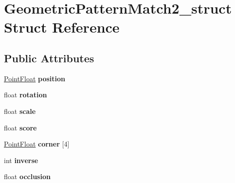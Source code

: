 \hypertarget{structGeometricPatternMatch2__struct}{
\section{GeometricPatternMatch2\_\-struct Struct Reference}
\label{structGeometricPatternMatch2__struct}
}
\subsection*{Public Attributes}
\begin{DoxyCompactItemize}
\item 
\hypertarget{structGeometricPatternMatch2__struct_a197646db066aac408c3dd50662664afc}{
\hyperlink{structPointFloat__struct}{PointFloat} {\bfseries position}}
\label{structGeometricPatternMatch2__struct_a197646db066aac408c3dd50662664afc}

\item 
\hypertarget{structGeometricPatternMatch2__struct_a0eb2e4974c7d011dc437797d251a2bfb}{
float {\bfseries rotation}}
\label{structGeometricPatternMatch2__struct_a0eb2e4974c7d011dc437797d251a2bfb}

\item 
\hypertarget{structGeometricPatternMatch2__struct_a458223db8c39fdc0062671887d1a883e}{
float {\bfseries scale}}
\label{structGeometricPatternMatch2__struct_a458223db8c39fdc0062671887d1a883e}

\item 
\hypertarget{structGeometricPatternMatch2__struct_ae58b9b6a3ca19838279696601c0025f9}{
float {\bfseries score}}
\label{structGeometricPatternMatch2__struct_ae58b9b6a3ca19838279696601c0025f9}

\item 
\hypertarget{structGeometricPatternMatch2__struct_ab112c1bb1b39eb7263b2723a9bd37c32}{
\hyperlink{structPointFloat__struct}{PointFloat} {\bfseries corner} \mbox{[}4\mbox{]}}
\label{structGeometricPatternMatch2__struct_ab112c1bb1b39eb7263b2723a9bd37c32}

\item 
\hypertarget{structGeometricPatternMatch2__struct_a231cf434fd9b5f5c6dd67d9e1f8280c1}{
int {\bfseries inverse}}
\label{structGeometricPatternMatch2__struct_a231cf434fd9b5f5c6dd67d9e1f8280c1}

\item 
\hypertarget{structGeometricPatternMatch2__struct_afe5c6d97465e14aa2ed80a17a2df4531}{
float {\bfseries occlusion}}
\label{structGeometricPatternMatch2__struct_afe5c6d97465e14aa2ed80a17a2df4531}


\end{DoxyCompactItemize}

